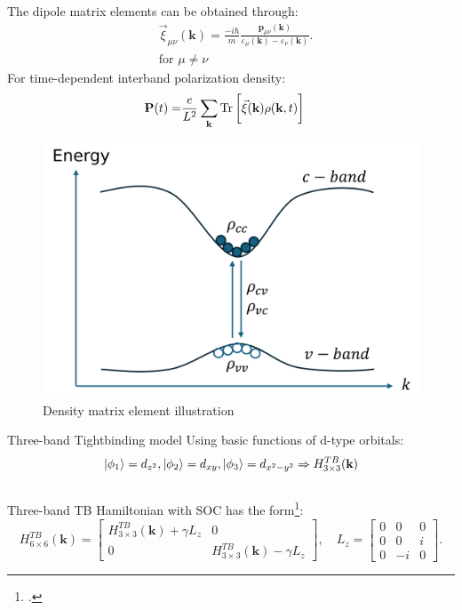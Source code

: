 \documentclass{beamer}
\begin{document}
\begin{frame}
	\begin{multicols}{2}
The dipole matrix elements can be obtained through:
		\begin{align}
			&\vec{\xi}_{\mu\nu}(\textbf{k}) = \frac{-i\hbar}{m}\frac{\textbf{p}_{\mu\nu}(\textbf{k})}{\varepsilon_{\mu}(\textbf{k}) - \varepsilon_{\nu}(\textbf{k})}.\\
			&\text{for } \mu \neq \nu \nonumber
		\end{align}
For time-dependent interband polarization density:
		\begin{align}
			\textbf{P}(t) = &\frac{e}{L^2} \sum_{\textbf{k}} \Tr\bigg[\vec{\xi}(\textbf{k})\rho(\textbf{k},t)\bigg]
		\end{align}
		\columnbreak
		\begin{figure}
			\includegraphics[width=1\linewidth]{images/cvbeamer.pdf}
			\caption{Density matrix element illustration}
		\end{figure}
	\end{multicols}
\end{frame}
\begin{frame}{Three-band Tightbinding model}
	Using basic functions of d-type orbitals: $$\ket{\phi_1} = d_{z^2}, \ket{\phi_2} = d_{xy}, \ket{\phi_3} = d_{x^2- y^2}\Rightarrow H^{TB}_{3\times 3}(\textbf{k})$$
	\\Three-band TB Hamiltonian with SOC has the form\footcite{liu_three-band_2013}:
	\begin{equation*}
		H^{TB}_{6\times 6}(\textbf{k}) = \begin{bmatrix}
			H^{TB}_{3\times 3}(\textbf{k}) + \gamma L_z & 0\\ 0& H^{TB}_{3\times 3}(\textbf{k}) - \gamma L_z
		\end{bmatrix}, \quad L_z= \begin{bmatrix}
			0 & 0 & 0\\
			0 & 0 & i\\
			0 & -i& 0
		\end{bmatrix}.
	\end{equation*}
\end{frame}
\end{document}
